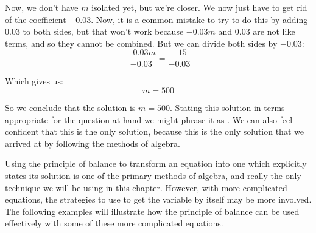 Now, we don’t have $m$ isolated yet, but we’re closer. We now just have to get rid of the coefficient $-0.03$. Now, it is a common mistake to try to do this by adding $0.03$ to both sides, but that won’t work because $-0.03m$ and $0.03$ are not like terms, and so they cannot be combined.  But we can divide both sides by $-0.03$:
$$\frac{-0.03m}{\bm{-0.03}} = \frac{-15}{\bm{-0.03}}$$

Which gives us:
$$m = 500$$

So we conclude that the solution is $m = 500$.  Stating this solution in terms appropriate for the question at hand we might phrase it as . We can also feel confident that this is the only solution, because this is the only solution that we arrived at by following the methods of algebra.

Using the principle of balance to transform an equation into one which explicitly states its solution is one of the primary methods of algebra, and really the only technique we will be using in this chapter. However, with more complicated equations, the strategies to use to get the variable by itself may be more involved. The following examples will illustrate how the principle of balance can be used effectively with some of these more complicated equations.



